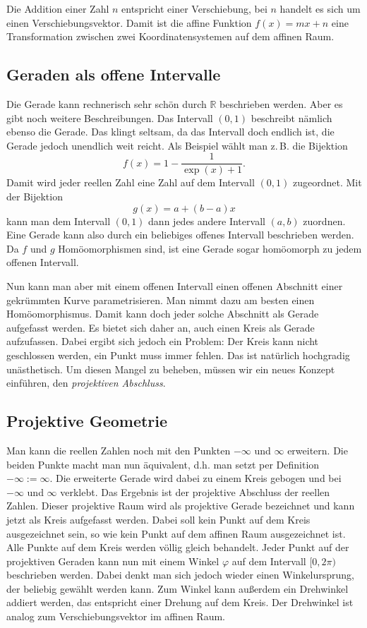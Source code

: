 \documentclass[a4paper,10pt,fleqn,twocolumn,twoside,dvipdfmx]{scrartcl}
\newcommand{\R}{\mathbb R}
\begin{document}
Die Addition einer Zahl $n$ entspricht einer Verschiebung,
bei $n$ handelt es sich um einen Verschiebungsvektor. Damit ist
die affine Funktion $f(x)=mx+n$ eine Transformation zwischen zwei
Koordinatensystemen auf dem affinen Raum.

\subsection{Geraden als offene Intervalle}
Die Gerade kann rechnerisch sehr schön durch $\R$ beschrieben
werden. Aber es gibt noch weitere Beschreibungen. Das Intervall
$(0,1)$ beschreibt nämlich ebenso die Gerade. Das klingt seltsam,
da das Intervall doch endlich ist, die Gerade jedoch unendlich weit
reicht. Als Beispiel wählt man z.\,B. die Bijektion
\begin{equation}
f(x) = 1-\frac{1}{\exp(x)+1}.
\end{equation}
Damit wird jeder reellen Zahl eine Zahl auf dem Intervall $(0,1)$
zugeordnet. Mit der Bijektion
\begin{equation}
g(x) = a+(b-a)x
\end{equation}
kann man dem Intervall $(0,1)$ dann jedes andere Intervall
$(a,b)$ zuordnen. Eine Gerade kann also durch ein beliebiges offenes
Intervall beschrieben werden. Da $f$ und $g$ Homöomorphismen sind,
ist eine Gerade sogar homöomorph zu jedem offenen Intervall.

Nun kann man aber mit einem offenen Intervall einen offenen Abschnitt
einer gekrümmten Kurve parametrisieren. Man nimmt dazu am besten
einen Homöomorphismus. Damit kann doch jeder solche Abschnitt als
Gerade aufgefasst werden. Es bietet sich daher an, auch einen Kreis
als Gerade aufzufassen. Dabei ergibt sich jedoch ein Problem: Der
Kreis kann nicht geschlossen werden, ein Punkt muss immer fehlen.
Das ist natürlich hochgradig unästhetisch. Um diesen Mangel zu
beheben, müssen wir ein neues Konzept einführen, den
\emph{projektiven Abschluss}.

\subsection{Projektive Geometrie}

Man kann die reellen Zahlen noch mit den Punkten $-\infty$
und $\infty$ erweitern. Die beiden Punkte macht man nun äquivalent,
d.h. man setzt per Definition $-\infty:=\infty$. Die erweiterte
Gerade wird dabei zu einem Kreis gebogen und bei $-\infty$ und
$\infty$ verklebt. Das Ergebnis ist der projektive Abschluss der
reellen Zahlen. Dieser projektive Raum wird als projektive Gerade
bezeichnet und kann jetzt als Kreis aufgefasst werden. Dabei soll
kein Punkt auf dem Kreis ausgezeichnet sein, so wie kein Punkt auf
dem affinen Raum ausgezeichnet ist. Alle Punkte auf dem Kreis werden
völlig gleich behandelt. Jeder Punkt auf der projektiven Geraden kann
nun mit einem Winkel $\varphi$ auf dem Intervall $[0,2\pi)$
beschrieben werden. Dabei denkt man sich jedoch wieder einen
Winkelursprung, der beliebig gewählt werden kann. Zum Winkel kann
außerdem ein Drehwinkel addiert werden, das entspricht einer Drehung
auf dem Kreis. Der Drehwinkel ist analog zum Verschiebungsvektor im
affinen Raum.
\end{document}

